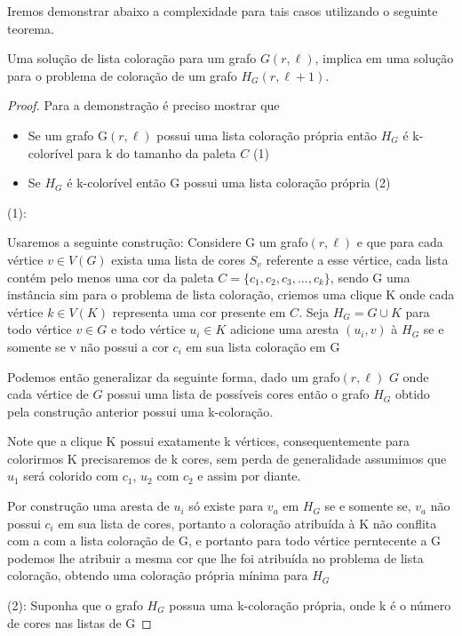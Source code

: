 Iremos demonstrar abaixo a complexidade para tais casos utilizando o seguinte teorema. 
\begin{teorema}
\label{theorem:list-coloring}
	Uma solução de lista coloração para um grafo $G(r,\ell)$, implica em uma solução para o problema de coloração de um grafo $H_G(r,\ell+1)$.
\end{teorema}
\begin{proof}
	Para a demonstração é preciso mostrar que
	\begin{itemize}
		\item Se um grafo G$(r,\ell)$ possui uma lista coloração própria então $H_G$ é k-colorível para k do tamanho da paleta $C$ (1)
		\item Se $H_G$ é k-colorível então G possui uma lista coloração própria (2)
	\end{itemize}
	(1):\newline
	
	Usaremos a seguinte construção:\newline
	Considere G um grafo$(r,\ell)$ e que para cada vértice $v \in V(G)$ exista uma lista de cores $S_v$ referente a esse vértice, cada lista contém pelo menos uma cor da paleta $C = \{c_1,c_2,c_3,...,c_k \}$, sendo G uma instância sim para o problema de lista coloração, criemos uma clique K onde cada vértice $k \in V(K)$ representa uma cor presente em $C$. Seja $H_G = G \cup K$ para todo vértice $v \in G$ e todo vértice $u_i \in K$ adicione uma aresta $(u_i,v)$ à $H_G$ se e somente se v não possui a cor $c_i$ em sua lista coloração em G
	
	Podemos então generalizar da seguinte forma, dado um grafo$(r,\ell)$ $G$ onde cada vértice de $G$ possui uma lista de possíveis cores então o grafo $H_G$ obtido pela construção anterior possui uma k-coloração.
	
	Note que a clique K possui exatamente k vértices, consequentemente para colorirmos K precisaremos de k cores, sem perda de generalidade assumimos que $u_1$ será colorido com $c_1$, $u_2$ com $c_2$ e assim por diante.
	
	Por construção uma aresta de $u_i$ só existe para $v_a$ em $H_G$ se e somente se, $v_a$ não possui $c_i$ em sua lista de cores, portanto a coloração atribuída à K não conflita com a com a lista coloração de G, e portanto para todo vértice perntecente a G podemos lhe atribuir a mesma cor que lhe foi atribuída no problema de lista coloração, obtendo uma coloração própria mínima para $H_G$
	
	(2):\newline
	Suponha que o grafo $H_G$ possua uma k-coloração própria, onde k é o número de cores nas listas de G
	

\end{proof}
